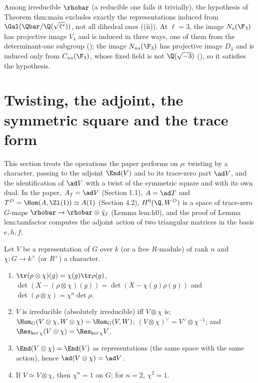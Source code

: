 \begin{paperlink}
Among irreducible $\rhobar$ (a reducible one fails it trivially), the hypothesis of Theorem thm:main excludes exactly the representations
induced from $\Gal(\Qbar/\Q(\sqrt{\ell^*}))$, not all dihedral ones ((ii)). At
$\ell=3$, the image $N_s(\F_3)$ has projective image $V_4$ and is induced in three ways, one of them from the determinant-one subgroup
(); the image $N_{ns}(\F_3)$ has projective image $D_4$ and is induced only from $C_{ns}(\F_3)$, whose fixed field is not
$\Q(\sqrt{-3})$ (), so it satisfies the hypothesis.
\end{paperlink}

\section[Twisting, the adjoint and the trace form]{Twisting, the adjoint, the symmetric square and the trace form}\label{sec:reps:adjoint}

This section treats the operations the paper performs on $\rho$: twisting by a character, passing to the adjoint $\End(V)$ and to its
trace-zero part $\ad V$, and the identification of $\ad V$ with a twist of the symmetric square and with its own dual. In the paper,
$A_f=\ad V$ (Section 1.1), $A=\ad T$ and $T^D=\Hom(A,\Zl(1))\simeq A(1)$ (Section 4.2), $H^0(\Q,W^D)$ is a space of trace-zero $G$-maps
$\rhobar\to\rhobar\otimes\bar\chi_\ell$ (Lemma lem:h0), and the proof of Lemma lem:tamfactor computes the adjoint action of two triangular
matrices in the basis $e,h,f$.

\begin{proposition}[Twisting]\label{prop:reps:twist}
Let $V$ be a representation of $G$ over $k$ (or a free $R$-module) of rank $n$ and $\chi\colon G\to k^\times$ (or $R^\times$) a character.
\begin{enumerate}[label=(\roman*)]
\item $\tr(\rho\otimes\chi)(g)=\chi(g)\tr\rho(g)$, $\det(X-(\rho\otimes\chi)(g))=\det(X-\chi(g)\rho(g))$ and $\det(\rho\otimes\chi)=\chi^n\det\rho$.
\item $V$ is irreducible (absolutely irreducible) iff $V\otimes\chi$ is; $\Hom_G(V\otimes\chi,W\otimes\chi)=\Hom_G(V,W)$; $(V\otimes\chi)^\vee=V^\vee\otimes\chi^{-1}$; and
$\Res_{\ker\chi}(V\otimes\chi)=\Res_{\ker\chi}V$.
\item $\End(V\otimes\chi)=\End(V)$ as representations (the same space with the same action), hence $\ad(V\otimes\chi)=\ad V$.
\item If $V\simeq V\otimes\chi$, then $\chi^n=1$ on $G$; for $n=2$, $\chi^2=1$.
\end{enumerate}
\end{proposition}

